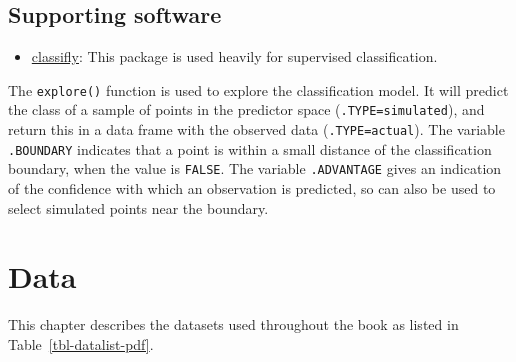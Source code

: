 \documentclass[
  letterpaper,
]{krantz}
\providecommand{\tightlist}{%
  \setlength{\itemsep}{0pt}\setlength{\parskip}{0pt}}
\begin{document}
\section{Supporting software}\label{supporting-software}

\begin{itemize}
\tightlist
\item
  \href{https://github.com/hadley/classifly}{classifly}: This package is
  used heavily for supervised classification.
\end{itemize}

The \texttt{explore()} function is used to explore the classification
model. It will predict the class of a sample of points in the predictor
space (\texttt{.TYPE=simulated}), and return this in a data frame with
the observed data (\texttt{.TYPE=actual}). The variable
\texttt{.BOUNDARY} indicates that a point is within a small distance of
the classification boundary, when the value is \texttt{FALSE}. The
variable \texttt{.ADVANTAGE} gives an indication of the confidence with
which an observation is predicted, so can also be used to select
simulated points near the boundary.

\chapter{Data}\label{data}

This chapter describes the datasets used throughout the book as listed
in Table~\ref{tbl-datalist-pdf}.
\end{document}
